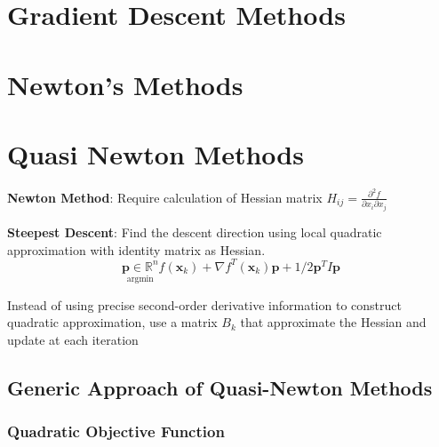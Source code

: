 \documentclass[
  letterpaper,
  DIV=11,
  numbers=noendperiod]{scrreprt}
\theoremstyle{definition}
\theoremstyle{plain}
\theoremstyle{plain}
\theoremstyle{definition}
\theoremstyle{plain}
\theoremstyle{plain}
\theoremstyle{remark}
\begin{document}
\chapter{Gradient Descent Methods}\label{gradient-descent-methods}

\chapter{Newton's Methods}\label{newtons-methods}

\chapter{Quasi Newton Methods}\label{quasi-newton-methods}

\textbf{Newton Method}: Require calculation of Hessian matrix
\(H_{ij}=\frac{\partial^2f}{\partial x_i\partial x_j}\)

\textbf{Steepest Descent}: Find the descent direction using local
quadratic approximation with identity matrix as Hessian. \[
\underset{\mathrm{argmin}}{\mathbf{p}\in\mathbb{R}^n}f(\mathbf{x}_k)+\nabla f^T(\mathbf{x}_k)\mathbf{p}+1/2\mathbf{p}^TI\mathbf{p}
\]

\begin{tcolorbox}[enhanced jigsaw, bottomrule=.15mm, title=\textcolor{quarto-callout-tip-color}{\faLightbulb}\hspace{0.5em}{Idea of Quasi-Newton Method}, left=2mm, colback=white, toprule=.15mm, bottomtitle=1mm, titlerule=0mm, leftrule=.75mm, colbacktitle=quarto-callout-tip-color!10!white, opacitybacktitle=0.6, coltitle=black, colframe=quarto-callout-tip-color-frame, rightrule=.15mm, breakable, toptitle=1mm, arc=.35mm, opacityback=0]

Instead of using precise second-order derivative information to
construct quadratic approximation, use a matrix \(B_k\) that approximate
the Hessian and update at each iteration

\end{tcolorbox}

\section{Generic Approach of Quasi-Newton
Methods}\label{generic-approach-of-quasi-newton-methods}

\subsection{Quadratic Objective
Function}\label{quadratic-objective-function}
\end{document}
